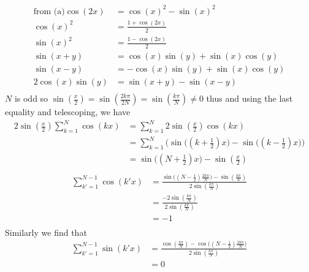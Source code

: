 \documentclass[12pt,twoside]{article}
\begin{document}
\begin{enumerate}
\begin{enumerate}
 \begin{align*}
 \text{from (a)}	\cos(2 x)			&= \cos(x)^2 - \sin(x)^2 \\
			\cos(x)^2 			&= \frac{1 + \cos(2 x)} {2} \\
			\sin(x)^2			&=  \frac{1 - \cos(2 x)} {2} \\
			\sin(x+y) 			& = \cos(x)\sin(y) + \sin(x)\cos(y)\\
			\sin(x - y)			&= -\cos(x) \sin(y) + \sin(x) \cos(y) \\
			 2 \cos(x) \sin(y)	&= \sin(x + y) - \sin( x- y) \\
 \end{align*}
 $N$ is odd so $\sin(\frac{x}{2}) = \sin( \frac{2 k \pi}{2N} ) = \sin( \frac{k \pi}{N} ) \neq 0$ thus and using the last equality and telescoping, we have 
 \begin{align*}
 		2 \sin(\frac{x}{2}) \sum_{k=1}^N \cos(k x)	&=  \sum_{k=1}^N  2 \sin(\frac{x}{2})  \cos(k x) \\
										&= \sum_{k=1}^N \bigg( \sin \bigg( (k + \frac{1}{2}) x \bigg) -  \sin \bigg( (k - \frac{1}{2}) x \bigg) \bigg) \\
										&= \sin \bigg( (N + \frac{1}{2}) x \bigg) - \sin(\frac{x}{2})\\
 \end{align*}
 \begin{align*}
	  \sum_{k'=1}^{N-1} \cos(k' x)	&= \frac{ \sin \bigg( (N - \frac{1}{2}) \frac{2 k \pi}{N} \bigg)   - \sin(\frac{k \pi}{N}) } {2 \sin( \frac{k \pi}{N} )} \\
	  						&= \frac{-2 \sin( \frac{k \pi}{N} ) } {2 \sin( \frac{k \pi}{N} )} \\
							&= -1 \\
\end{align*}
 Similarly we find that
  \begin{align*}
   	\sum_{k'=1}^{N-1} \sin(k' x)	&=  \frac{ \cos(\frac{k \pi}{N}) - \cos \bigg( (N - \frac{1}{2}) \frac{2 k \pi}{N} \bigg) } {2 \sin( \frac{k \pi}{N} )} \\
							&= 0
 \end{align*}
 

\end{enumerate}
\end{enumerate}
\end{document}
